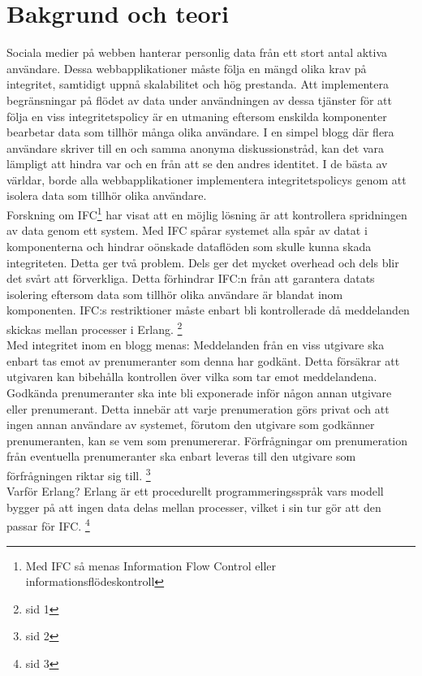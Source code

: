 \documentclass[12pt]{article}
\begin{document}
 \section{Bakgrund och teori}


Sociala medier på webben hanterar personlig data från ett stort antal aktiva användare.
Dessa webbapplikationer måste följa en mängd olika krav på integritet, samtidigt uppnå skalabilitet och hög prestanda.
Att implementera begränsningar på flödet av data under användningen av dessa tjänster för att följa en viss integritetspolicy är en utmaning eftersom enskilda komponenter bearbetar data som tillhör många olika användare.
I en simpel blogg där flera användare skriver till en och samma anonyma diskussionstråd, kan det vara lämpligt att hindra var och en från att se den andres identitet.
I de bästa av världar, borde alla webbapplikationer implementera integritetspolicys genom att isolera data som tillhör olika användare.\\


Forskning om IFC\footnote{Med IFC så menas Information Flow Control eller informationsflödeskontroll} har visat att en möjlig lösning är att kontrollera spridningen av data genom ett system.
Med IFC spårar systemet alla spår av datat i komponenterna och hindrar oönskade dataflöden som skulle kunna skada integriteten.
Detta ger två problem.
Dels ger det mycket overhead och dels blir det svårt att förverkliga.
Detta förhindrar IFC:n från att garantera datats isolering eftersom data som tillhör olika användare är blandat inom komponenten.
IFC:s restriktioner måste enbart bli kontrollerade då meddelanden skickas mellan processer i Erlang.
 \footnote{sid 1\cite{IFC}}
\\
Med integritet inom en blogg menas:
Meddelanden från en viss utgivare ska enbart tas emot av prenumeranter som denna har godkänt.
Detta försäkrar att utgivaren kan bibehålla kontrollen över vilka som tar emot meddelandena.
Godkända prenumeranter ska inte bli exponerade inför någon annan utgivare eller prenumerant.
Detta innebär att varje prenumeration görs privat och att ingen annan användare av systemet, förutom den utgivare som godkänner prenumeranten, kan se vem som prenumererar.
Förfrågningar om prenumeration från eventuella prenumeranter ska enbart leveras till den utgivare som förfrågningen riktar sig till.
\footnote{sid 2\cite{IFC}}
\\
Varför Erlang? Erlang är ett procedurellt programmeringsspråk vars modell bygger på att ingen data delas mellan processer, vilket i sin tur gör att den passar för IFC.
\footnote{ sid 3\cite{IFC}}
\end{document}
